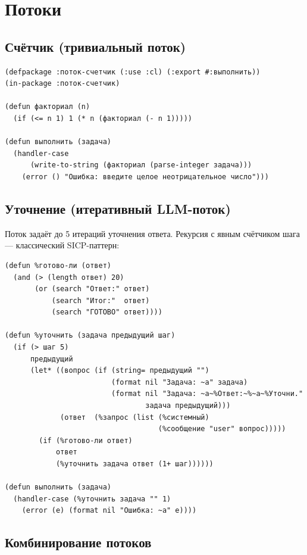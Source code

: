 \documentclass[11pt,a4paper]{article}
\begin{document}
\section{Потоки}

\subsection{Счётчик (тривиальный поток)}

\begin{lstlisting}[caption={мастер/потоки/счетчик.lisp}]
(defpackage :поток-счетчик (:use :cl) (:export #:выполнить))
(in-package :поток-счетчик)

(defun факториал (n)
  (if (<= n 1) 1 (* n (факториал (- n 1)))))

(defun выполнить (задача)
  (handler-case
      (write-to-string (факториал (parse-integer задача)))
    (error () "Ошибка: введите целое неотрицательное число")))
\end{lstlisting}

\subsection{Уточнение (итеративный LLM-поток)}

Поток задаёт до 5 итераций уточнения ответа. Рекурсия с явным счётчиком шага — классический SICP-паттерн:

\begin{lstlisting}[caption={мастер/потоки/уточнение.lisp}]
(defun %готово-ли (ответ)
  (and (> (length ответ) 20)
       (or (search "Ответ:" ответ)
           (search "Итог:"  ответ)
           (search "ГОТОВО" ответ))))

(defun %уточнить (задача предыдущий шаг)
  (if (> шаг 5)
      предыдущий
      (let* ((вопрос (if (string= предыдущий "")
                         (format nil "Задача: ~a" задача)
                         (format nil "Задача: ~a~%Ответ:~%~a~%Уточни."
                                 задача предыдущий)))
             (ответ  (%запрос (list (%системный)
                                    (%сообщение "user" вопрос)))))
        (if (%готово-ли ответ)
            ответ
            (%уточнить задача ответ (1+ шаг))))))

(defun выполнить (задача)
  (handler-case (%уточнить задача "" 1)
    (error (e) (format nil "Ошибка: ~a" e))))
\end{lstlisting}

\subsection{Комбинирование потоков}
\end{document}

